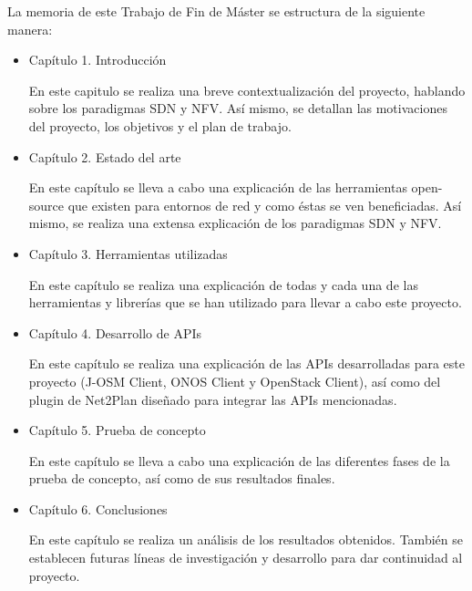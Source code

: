 La memoria de este Trabajo de Fin de Máster se estructura de la siguiente manera:
\begin{itemize}
	
	\item Capítulo 1. Introducción
	
	En este capitulo se realiza una breve contextualización del proyecto, hablando sobre los paradigmas SDN y NFV. Así mismo, se detallan las motivaciones del proyecto, los objetivos y el plan de trabajo.
	
	\item Capítulo 2. Estado del arte
	
	En este capítulo se lleva a cabo una explicación de las herramientas open-source que existen para entornos de red y como éstas se ven beneficiadas. Así mismo, se realiza una extensa explicación de los paradigmas SDN y NFV.
	
	\item Capítulo 3. Herramientas utilizadas
	
	En este capítulo se realiza una explicación de todas y cada una de las herramientas y librerías que se han utilizado para llevar a cabo este proyecto.
	
	\item Capítulo 4. Desarrollo de APIs
	
	En este capítulo se realiza una explicación de las APIs desarrolladas para este proyecto (J-OSM Client, ONOS Client y OpenStack Client), así como del plugin de Net2Plan diseñado para integrar las APIs mencionadas.
	
	\item Capítulo 5. Prueba de concepto
	
	En este capítulo se lleva a cabo una explicación de las diferentes fases de la prueba de concepto, así como de sus resultados finales.
	
	\item Capítulo 6. Conclusiones
	
	En este capítulo se realiza un análisis de los resultados obtenidos. También se establecen futuras líneas de investigación y desarrollo para dar continuidad al proyecto.
	
	
\end{itemize}
\cleardoublepage
	
